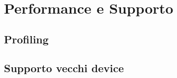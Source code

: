 \section{Performance e Supporto}

\subsection{Profiling}

\subsection{Supporto vecchi device}

\newpage